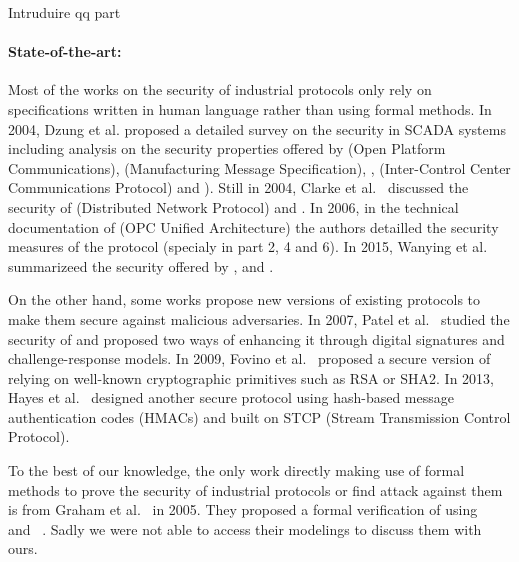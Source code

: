\TODO Intruduire \opcua qq part


\paragraph{State-of-the-art:}\label{sec:intro_sota}

Most of the works on the security of industrial protocols only rely on
specifications written in human language rather than using formal methods.
In 2004, Dzung et al. proposed a detailed survey on the security in SCADA
systems including analysis on the security properties offered by \opc (Open
Platform Communications), \mms (Manufacturing Message Specification),
, \iccp (Inter-Control Center Communications Protocol) and \etherip).
Still in 2004, Clarke et al.~\cite{CR04} discussed the security of \dnp
(Distributed Network Protocol) and \iccp.
In 2006, in the technical documentation of \opcua (OPC Unified Architecture) the
authors detailled the security measures of the protocol (specialy in part 2, 4
and 6).
In 2015, Wanying et al. summarizeed the security offered by \modbus, \dnp and
\opcua.

On the other hand, some works propose new versions of existing protocols to make
them secure against malicious adversaries.
In 2007, Patel et al.~\cite{PY07} studied the security of \dnp and proposed two
ways of enhancing it through digital signatures and challenge-response models.
In 2009, Fovino et al.~\cite{FCMT09} proposed a secure version of \modbus
relying on well-known cryptographic primitives such as RSA or SHA2.
In 2013, Hayes et al.~\cite{HE13} designed another secure \modbus protocol using
hash-based message authentication codes (HMACs) and built on STCP (Stream
Transmission Control Protocol).

To the best of our knowledge, the only work directly making use of formal
methods to prove the security of industrial protocols or find attack against
them is from Graham et al.~\cite{GP05} in 2005.
They proposed a formal verification of \dnp using \ofmc~\cite{BMV03} and
\spear~\cite{SH01}.
\TODO Sadly we were not able to access their modelings to discuss them with
ours.

